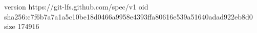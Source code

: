 version https://git-lfs.github.com/spec/v1
oid sha256:c7f6b7a7a1a5c10be18d0466a9958e4393ffa80616e539a51640adad922eb8d0
size 174916
